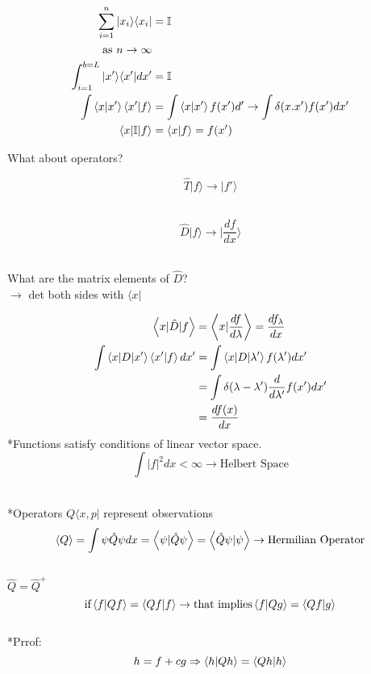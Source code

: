 \documentclass{article}
\begin{document}
\begin{align*}
\sum_{i=1}^{n}|x_{i}\rangle \langle x_{i}|&=\mathbb{I}\\
\mbox{as $n$} \rightarrow \infty\\
\int_{i=1}^{b=L}|x'\rangle\langle x'|dx'&=\mathbb{I}\\
\int \ev{x|x'}\ev{x'|f}&=\int\ev{x|x'}f(x')d' \rightarrow \int\delta(x.x')f(x')dx'\\
\ev{x|\mathbb{I}|f}&=\ev{x|f}=f(x')
\end{align*}

\vspace{1cm}

What about operators?

$$\hat{T}|f\rangle \rightarrow |f'\rangle$$\

$$\hat{D}|f\rangle \rightarrow \mid \frac{df}{dx}\rangle$$\

What are the matrix elements of $\hat{D}$?\\

$\rightarrow$ det both sides with $\langle x|$\

\begin{align*}
\ev{x|\hat{D}|f}&=\ev{x|\frac{df}{d\lambda}}=\frac{df_{\lambda}}{dx}\\
\int \ev{x|D|x'} \ev{x'|f}dx'&=\int \ev{x|D|\lambda'}f(\lambda')dx'\\
&=\int \delta(\lambda-\lambda')\frac{d}{d\lambda'}f(x')dx'\\
&=\frac{df(x)}{dx}
\end{align*}
\newpage
*Functions satisfy conditions of linear vector space.\\

$$\int|f|^{2}dx < \infty \rightarrow \mbox{Helbert Space}$$\

*Operators $Q\langle x,p|$ represent observations\\

$$\ev{Q}=\int\psi\hat{Q}\psi dx=\ev{\psi|\hat{Q}\psi}=\ev{\hat{Q}\psi|\psi} \rightarrow \mbox{Hermilian Operator}$$\\

$\hat{Q}=\hat{Q}^{+}$\\

$$\mbox{if} \ev{f|Qf}=\ev{Qf|f} \rightarrow \mbox{that implies} \ev{f|Qg}=\ev{Qf|g}$$\\

*Prrof:\\

$$h=f+cg \Rightarrow \ev{h|Qh}=\ev{Qh|h}$$\
\end{document}
